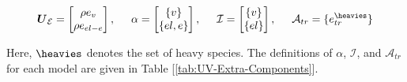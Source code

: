 \documentclass[10pt]{article}
\begin{document}
\begin{flushleft}
\begin{equation*}
    \bigU_{\mathcal{E}} = \begin{bmatrix}
        \rho e_v \\ \rho e_{el-e}
    \end{bmatrix} , \hspace{5mm}
    \alpha = \begin{bmatrix}
        \{v\} \\ \{el,e\}
    \end{bmatrix}, \hspace{5mm} 
    \mathcal{I} = \begin{bmatrix}
        \{v\} \\ \{el\}
    \end{bmatrix}, \hspace{5mm}
    \mathcal{A}_{tr} = \{e_{tr}^{\heavies}\}    
\end{equation*}

Here, $\heavies$ denotes the set of heavy species. The definitions of $\alpha$, $\mathcal{I}$, and $\mathcal{A}_{tr}$ for each model are given in Table [\ref{tab:UV-Extra-Components}].


\end{flushleft}
\end{document}
